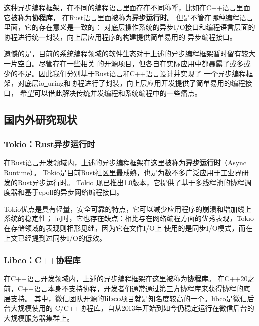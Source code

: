 \documentclass[supercite]{HustGraduPaper}
\theoremstyle{definition}
\begin{document}
这种异步编程框架，在不同的编程语言里面存在不同称呼，比如在C++语言里面它被称为\textbf{协程库}，
在Rust语言里面被称为\textbf{异步运行时}\cite{rosendahl2017green}。
但是不管在哪种编程语言里面，它的存在意义是一致的：
对底层操作系统的异步I/O接口和编程语言层面的协程进行统一封装，向上层应用程序的构建提供简单易用的
异步编程接口。\par

遗憾的是，目前的系统编程领域的软件生态对于上述的异步编程框架暂时留有较大一片空白。尽管存在一些相关
的开源项目，但各自在实际应用中都暴露了或多或少的不足。因此我们分别基于Rust语言\cite{klabnik2019rust}和C++语言设计并实现了
一个异步编程框架，对底层io\underline{~}uring和协程进行了封装，向上层应用开发提供了简单易用的编程接口，
希望可以借此解决传统并发编程和系统编程中的一些痛点。\par

\subsection{国内外研究现状}

\subsubsection{Tokio：Rust异步运行时}
在Rust语言开发领域内，上述的异步编程框架在这里被称为\textbf{异步运行时}（Async Runtime）。
Tokio\cite{tokio.org}是目前Rust社区里最成熟，也是为数不多广泛应用于工业界研发的Rust异步运行时。
Tokio 现已推出1.0版本，它提供了基于多线程池的协程调度器和基于epoll\cite{gammo2004comparing}的异步网络编程接口。\par

Tokio优点是具有轻量，安全可靠的特点，它可以减少应用程序的崩溃和增加线上系统的稳定性；
同时，它也存在缺点：相比与在网络编程方面的优秀表现，Tokio在存储领域的表现则相形见绌，因为它在文件I/O上
使用的是同步I/O模式，而在上文已经提到过同步I/O的低效。\par

\subsubsection{Libco：C++协程库}
在C++语言开发领域内，上述的异步编程框架在这里被称为\textbf{协程库}。
在C++20之前，C++语言本身不支持协程，开发者们通常通过第三方协程库来获得协程的底层支持。
其中，微信团队开源的\textbf{libco}\cite{libco.org}项目就是知名度较高的一个。libco是微信后台大规模使用的
C/C++协程库，自从2013年开始到如今仍稳定运行在微信后台的大规模服务器集群上。\par
\end{document}
